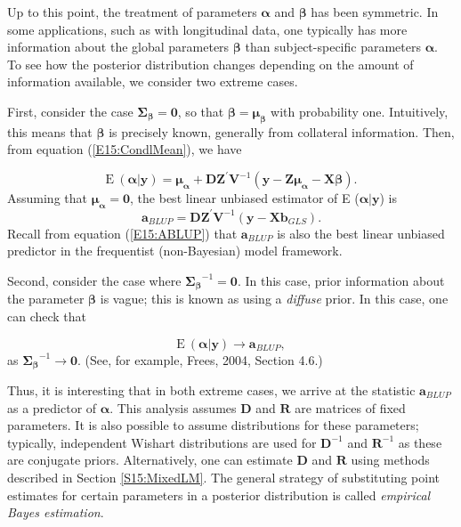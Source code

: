 Up to this point, the treatment of parameters $\boldsymbol \alpha$
and $\boldsymbol \beta$ has been symmetric. In some applications,
such as with longitudinal data, one typically has more information
about the global parameters $\boldsymbol \beta$  than
subject-specific parameters $\boldsymbol \alpha$. To see how the
posterior distribution changes depending on the amount of
information available, we consider two extreme cases.

First, consider the case  $\boldsymbol{\Sigma _{\beta}}=
\mathbf{0}$, so that $\boldsymbol \beta=\boldsymbol{\mu _{\beta}}$
with probability one. Intuitively, this means that $\boldsymbol
\beta$ is precisely known, generally from collateral information.
Then, from equation (\ref{E15:CondlMean}), we have

\begin{equation}\label{E15:CondlMean1}
\mathrm{E}~ (
    \boldsymbol \alpha |  \mathbf{y}) =
    \boldsymbol {\mu_{\alpha}} + \mathbf{DZ}^{\prime}
    \mathbf{V}^{-1}
     (\mathbf{y} -\mathbf{Z}\boldsymbol {\mu_{\alpha}} - \mathbf{X}\boldsymbol
     \beta) .
\end{equation}
Assuming that  $\boldsymbol{\mu _{\alpha}}= \mathbf{0}$, the best
linear unbiased estimator of E ($\boldsymbol \alpha | \mathbf{y}$)
is
\begin{equation*}
\mathbf{a}_{BLUP}  =  \mathbf{D Z}^{\prime} \mathbf{V}^{-1}
(\mathbf{y} - \mathbf{X b}_{GLS}).
\end{equation*}
Recall from equation (\ref{E15:ABLUP}) that $\mathbf{a}_{BLUP}$ is
also the best linear unbiased predictor in the frequentist
(non-Bayesian) model framework.


Second, consider the case where  $\boldsymbol{\Sigma _{\beta}}^{-1}=
\mathbf{0}$. In this case, prior information about the parameter
$\boldsymbol \beta$ is vague; this is known as using a
\emph{diffuse} prior. In this case, one can check that

\begin{equation*}
\mathrm{E}~ (\boldsymbol \alpha | \mathbf{y}) \rightarrow
\mathbf{a}_{BLUP},
\end{equation*}
as $\boldsymbol{\Sigma _{\beta}}^{-1}\rightarrow \mathbf{0}$. (See,
for example, Frees, 2004, Section 4.6.)

Thus, it is interesting that in both extreme cases, we arrive at the
statistic $\mathbf{a}_{BLUP}$ as a predictor of $\boldsymbol
\alpha$. This analysis assumes $\mathbf{D}$ and $\mathbf{R}$  are
matrices of fixed parameters. It is also possible to assume
distributions for these parameters; typically, independent Wishart
distributions are used for $\mathbf{D}^{-1}$ and $\mathbf{R}^{-1}$
as these are conjugate priors.  Alternatively, one can estimate
$\mathbf{D}$ and $\mathbf{R}$ using methods described in Section
\ref{S15:MixedLM}. The general strategy of substituting point
estimates for certain parameters in a posterior distribution is
called \emph{empirical Bayes estimation}.

